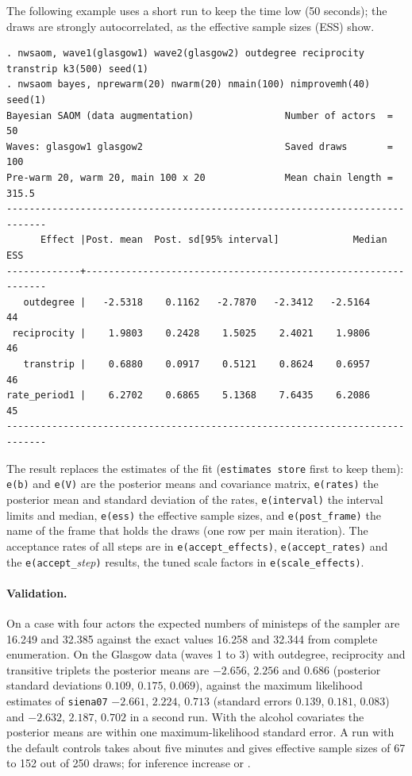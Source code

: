The following example uses a short run to keep the time low (50 seconds); the draws are strongly autocorrelated, as the effective sample sizes (ESS) show.
\begin{lstlisting}
. nwsaom, wave1(glasgow1) wave2(glasgow2) outdegree reciprocity transtrip k3(500) seed(1)
. nwsaom bayes, nprewarm(20) nwarm(20) nmain(100) nimprovemh(40) seed(1)
Bayesian SAOM (data augmentation)                Number of actors  =       50
Waves: glasgow1 glasgow2                         Saved draws       =      100
Pre-warm 20, warm 20, main 100 x 20              Mean chain length =    315.5
-----------------------------------------------------------------------------
      Effect |Post. mean  Post. sd[95% interval]             Median      ESS
-------------+---------------------------------------------------------------
   outdegree |   -2.5318    0.1162   -2.7870   -2.3412   -2.5164       44
 reciprocity |    1.9803    0.2428    1.5025    2.4021    1.9806       46
   transtrip |    0.6880    0.0917    0.5121    0.8624    0.6957       46
rate_period1 |    6.2702    0.6865    5.1368    7.6435    6.2086       45
-----------------------------------------------------------------------------
\end{lstlisting}
The result replaces the estimates of the fit (\texttt{estimates store} first to keep them): \texttt{e(b)} and \texttt{e(V)} are the posterior means and covariance matrix, \texttt{e(rates)} the posterior mean and standard deviation of the rates, \texttt{e(interval)} the interval limits and median, \texttt{e(ess)} the effective sample sizes, and \texttt{e(post\_frame)} the name of the frame that holds the draws (one row per main iteration). The acceptance rates of all steps are in \texttt{e(accept\_effects)}, \texttt{e(accept\_rates)} and the \texttt{e(accept\_}\emph{step}\texttt{)} results, the tuned scale factors in \texttt{e(scale\_effects)}.

\paragraph{Validation.} On a case with four actors the expected numbers of ministeps of the sampler are 16.249 and 32.385 against the exact values 16.258 and 32.344 from complete enumeration. On the Glasgow data (waves 1 to 3) with outdegree, reciprocity and transitive triplets the posterior means are $-2.656$, $2.256$ and $0.686$ (posterior standard deviations $0.109$, $0.175$, $0.069$), against the maximum likelihood estimates of \texttt{siena07} $-2.661$, $2.224$, $0.713$ (standard errors $0.139$, $0.181$, $0.083$) and $-2.632$, $2.187$, $0.702$ in a second run. With the alcohol covariates the posterior means are within one maximum-likelihood standard error. A run with the default controls takes about five minutes and gives effective sample sizes of 67 to 152 out of 250 draws; for inference increase  or .

